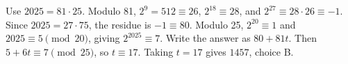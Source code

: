 Use $2025=81\cdot25$. Modulo 81, $2^9=512\equiv26$, $2^{18}\equiv28$, and $2^{27}\equiv28\cdot26\equiv-1$. Since $2025=27\cdot75$, the residue is $-1\equiv80$. Modulo 25, $2^{20}\equiv1$ and $2025\equiv5\pmod{20}$, giving $2^{2025}\equiv7$. Write the answer as $80+81t$. Then $5+6t\equiv7\pmod{25}$, so $t\equiv17$. Taking $t=17$ gives $\boxed{1457}$, choice B.
